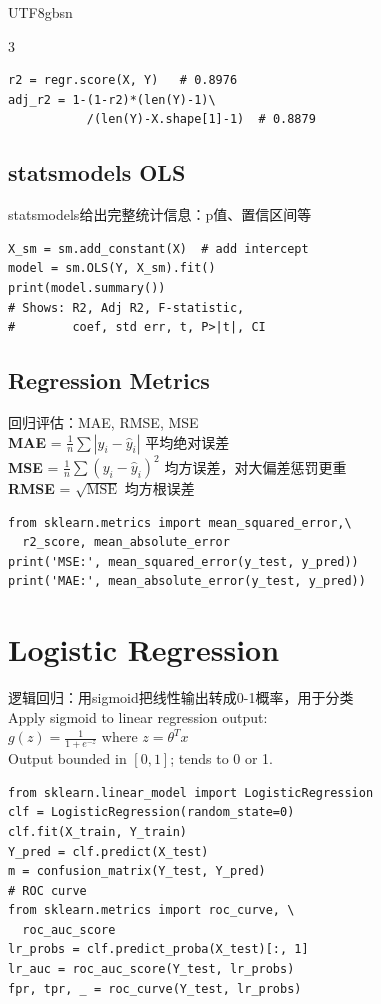 \documentclass[9pt,landscape,a4paper]{article}
\newcommand{\zhint}[1]{{\scriptsize\color{gray!70!black}#1}}
\begin{document}
\begin{CJK}{UTF8}{gbsn}
\begin{multicols}{3}
\begin{lstlisting}
r2 = regr.score(X, Y)   # 0.8976
adj_r2 = 1-(1-r2)*(len(Y)-1)\
           /(len(Y)-X.shape[1]-1)  # 0.8879
\end{lstlisting}

\subsection{statsmodels OLS}
\zhint{statsmodels给出完整统计信息：p值、置信区间等}

\begin{lstlisting}
X_sm = sm.add_constant(X)  # add intercept
model = sm.OLS(Y, X_sm).fit()
print(model.summary())
# Shows: R2, Adj R2, F-statistic,
#        coef, std err, t, P>|t|, CI
\end{lstlisting}

\subsection{Regression Metrics}
\zhint{回归评估：MAE, RMSE, MSE}\\[2pt]
\textbf{MAE} = $\frac{1}{n}\sum|y_i - \hat{y}_i|$ \zhint{平均绝对误差}\\[2pt]
\textbf{MSE} = $\frac{1}{n}\sum(y_i - \hat{y}_i)^2$ \zhint{均方误差，对大偏差惩罚更重}\\[2pt]
\textbf{RMSE} = $\sqrt{\text{MSE}}$ \zhint{均方根误差}

\begin{lstlisting}
from sklearn.metrics import mean_squared_error,\
  r2_score, mean_absolute_error
print('MSE:', mean_squared_error(y_test, y_pred))
print('MAE:', mean_absolute_error(y_test, y_pred))
\end{lstlisting}

\section{Logistic Regression}
\zhint{逻辑回归：用sigmoid把线性输出转成0-1概率，用于分类}\\
Apply sigmoid to linear regression output:\\
$g(z) = \frac{1}{1 + e^{-z}}$ \quad where $z = \theta^T x$\\
Output bounded in $[0, 1]$; tends to 0 or 1.

\begin{lstlisting}
from sklearn.linear_model import LogisticRegression
clf = LogisticRegression(random_state=0)
clf.fit(X_train, Y_train)
Y_pred = clf.predict(X_test)
m = confusion_matrix(Y_test, Y_pred)
# ROC curve
from sklearn.metrics import roc_curve, \
  roc_auc_score
lr_probs = clf.predict_proba(X_test)[:, 1]
lr_auc = roc_auc_score(Y_test, lr_probs)
fpr, tpr, _ = roc_curve(Y_test, lr_probs)
\end{lstlisting}


\end{multicols}
\end{CJK}
\end{document}
